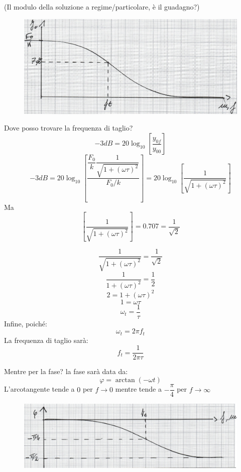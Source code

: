 \documentclass[a4paper, 15pt]{article}
\begin{document}
\begin{adjustwidth}{2in}{}
	(Il modulo della soluzione a regime/particolare, è il guadagno?)	
\begin{figure}[H]
	\centering
	\includegraphics[width=0.5\linewidth]{fig/mm7}
	\label{fig:mm7}
\end{figure}
	Dove posso trovare la frequenza di taglio? 
	\[ -3dB = 20\log_{10}\left[\dfrac{y_{0f}}{y_{00}}\right]\] 
	\[ -3dB = 20\log_{10}\left[\dfrac{\dfrac{F_0}{k}\dfrac{1}{\sqrt{1+(\omega \tau)^2}}}{F_0/k}\right] = 20\log_{10}\left[\dfrac{1}{\sqrt{1+(\omega \tau)^2}}\right] \] 
	Ma
	\[ \left[\dfrac{1}{\sqrt{1+(\omega \tau)^2}}\right] = 0.707 = \dfrac{1}{\sqrt{2}}\]
	
	\[ \dfrac{1}{\sqrt{1+(\omega \tau)^2}} = \dfrac{1}{\sqrt{2}} \]
	\[ \dfrac{1}{1+(\omega \tau)^2} = \dfrac{1}{2} \]	
	\[ 2 = 1+(\omega \tau)^2  \]
	\[ 1 = \omega \tau \]
	\[ \omega_t = \dfrac{1}{\tau}\]
	Infine, poiché:
	\[  \omega_t = 2\pi f_t\]
	La frequenza di taglio sarà: 
	\[  f_t = \dfrac{1}{2\pi\tau}\]
	
	Mentre per la fase? la fase sarà data da:
	\[ \varphi = \arctan(-\omega t) \]
	L'arcotangente tende a $0$ per $f\rightarrow0$ mentre tende a $-\dfrac{\pi}{4}$ per  $f\rightarrow\infty$	
	\begin{figure}[H]
		\centering
		\includegraphics[width=0.5\linewidth]{fig/mm8}
		\label{fig:mm8}
	\end{figure}
\end{adjustwidth}
\end{document}
